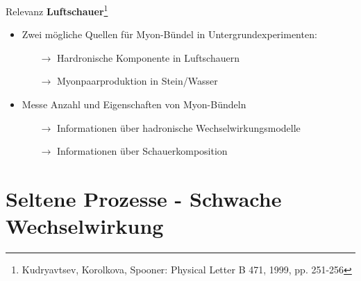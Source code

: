 \documentclass[aspectratio=1610, captions=tableheading, 11pt]{beamer}
\begin{document}
\begin{frame}{Relevanz}
	 \textbf{Luftschauer}\footnote{Kudryavtsev, Korolkova, Spooner: Physical Letter B 471, 1999, pp. 251-256}
	 \begin{itemize}
	 	\setlength\itemsep{0.5em}	 	
	 	\item Zwei mögliche Quellen für Myon-Bündel in Untergrundexperimenten:
	 	\begin{itemize}
	 		\item[$\rightarrow$] Hardronische Komponente in Luftschauern
	 		\item[$\rightarrow$] Myonpaarproduktion in Stein/Wasser
	 	\end{itemize}
	 	\vspace{5mm}
	 	\item Messe Anzahl und Eigenschaften von Myon-Bündeln
	 	\begin{itemize}
	 		\item[$\rightarrow$] Informationen über hadronische Wechselwirkungsmodelle
	 		\item[$\rightarrow$] Informationen über Schauerkomposition
	 	\end{itemize}
	 \end{itemize}
\end{frame}


\section{Seltene Prozesse - Schwache Wechselwirkung}
\end{document}
